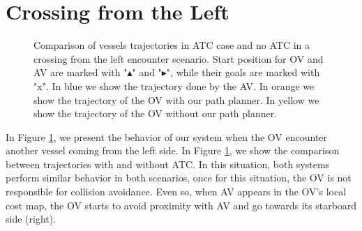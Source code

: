         
         
        
        \section{Crossing from the Left}
        
        \begin{figure}[H]
            \centering
            
            \caption{Comparison of vessels trajectories in \ac{ATC} case and no \ac{ATC} in a crossing from the left encounter scenario. Start position for \ac{OV} and \ac{AV} are marked with "$\blacktriangle$" and "$\blacktriangleright$", while their goals are marked with "x". In blue we show the trajectory done by the \ac{AV}. In orange we show the trajectory of the \ac{OV} with our path planner. In yellow we show the trajectory of the \ac{OV} without our path planner.}
            \label{fig:plot_cl_w_vs_wo}
        \end{figure}
        
        In Figure \ref{fig:plot_cl_w_vs_wo}, we present the behavior of our system when the \ac{OV} encounter another vessel coming from the left side. In Figure \ref{fig:plot_cl_w_vs_wo}, we show the comparison between trajectories with and without \ac{ATC}. In this situation, both systems perform similar behavior in both scenarios, once for this situation, the \ac{OV} is not responsible for collision avoidance. Even so, when \ac{AV} appears in the \ac{OV}'s local cost map, the \ac{OV} starts to avoid proximity with \ac{AV} and go towards its starboard side (right). 
        
